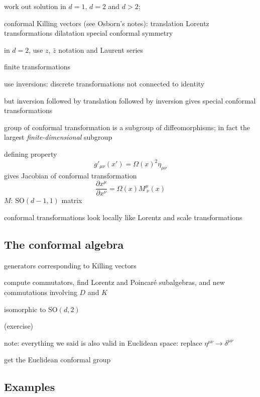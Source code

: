 \documentclass[a4paper,12pt]{article}
\newcommand{\SO}{\text{SO}}
\numberwithin{equation}{section}
\begin{document}
work out solution in $d = 1$, $d = 2$ and $d > 2$;


conformal Killing vectors (see Osborn's notes):
translation
Lorentz transformations
dilatation
special conformal symmetry



in $d = 2$, use $z$, $\bar{z}$ notation and Laurent series






finite transformations


use inversions: discrete transformations not connected to identity

but inversion followed by translation followed by inversion gives special conformal transformations


group of conformal transformation is a subgroup of diffeomorphisms; in fact the largest \emph{finite-dimensional} subgroup



defining property
\begin{equation}
	g'_{\mu\nu}(x') = \Omega(x)^2 \eta_{\mu\nu}
\end{equation}
gives Jacobian of conformal transformation
\begin{equation}
	\frac{\partial x^\mu}{\partial x^\nu}
	= \Omega(x) M^\mu_{~\nu}(x)
\end{equation}
$M$: $\SO(d-1, 1)$ matrix

conformal transformations look locally like Lorentz and scale transformations


\subsection{The conformal algebra}

generators corresponding to Killing vectors

compute commutators, find Lorentz and Poincaré subalgebras, and new commutations involving $D$ and $K$

isomorphic to $\SO(d, 2)$

(exercise)


note: everything we said is also valid in Euclidean space: replace $\eta^{\mu\nu} \to \delta^{\mu\nu}$

get the Euclidean conformal group



\subsection{Examples}
\end{document}

